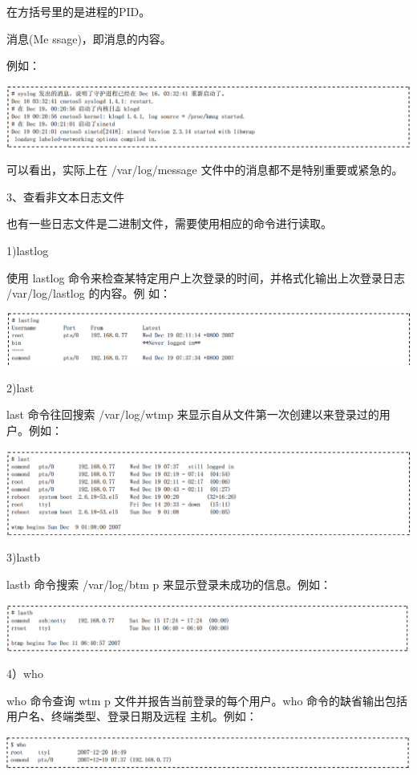 \documentclass[letterpaper,10pt]{sphinxmanual}
\begin{document}
在方括号里的是进程的PID。

消息(Me ssage)，即消息的内容。

例如：

\includegraphics{message.png}

可以看出，实际上在 /var/log/message 文件中的消息都不是特别重要或紧急的。

3、查看非文本日志文件

也有一些日志文件是二进制文件，需要使用相应的命令进行读取。

1)lastlog

使用 lastlog 命令来检查某特定用户上次登录的时间，并格式化输出上次登录日志 /var/log/lastlog 的内容。例
如：

\includegraphics{lastlog.png}

2)last

last 命令往回搜索 /var/log/wtmp 来显示自从文件第一次创建以来登录过的用户。例如：

\includegraphics{last.png}

3)lastb

lastb 命令搜索 /var/log/btm p 来显示登录未成功的信息。例如：

\includegraphics{lastb.png}

4）who

who 命令查询 wtm p 文件并报告当前登录的每个用户。who 命令的缺省输出包括用户名、终端类型、登录日期及远程
主机。例如：

\includegraphics{who.png}
\end{document}
